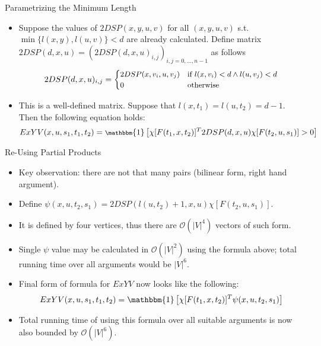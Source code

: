\documentclass{beamer}
\newcommand{\OO}{\mathcal{O}}
\begin{document}
\begin{frame}{Parametrizing the Minimum Length}
    \begin{itemize}
        \item Suppose the values of $2DSP(x, y, u, v)$ for all $(x, y, u, v)$ s.t. $\min\{l(x, y), l(u, v)\} < d$ are already calculated. Define matrix $2DSP(d,x,u) = (2DSP(d,x,u)_{i,j})_{i,j=0,\ldots,n-1}$ as follows
        \begin{equation}
            \small
            2DSP(d,x,u)_{i,j} = \begin{cases}
                2DSP(x,v_i,u,v_j) & \text{if } l(x,v_i) < d \wedge l(u,v_j) < d \\
                0                 & \text{otherwise}
            \end{cases}
        \end{equation}
        \item This is a well-defined matrix. Suppose that $l(x, t_1) = l(u, t_2) = d - 1$. Then the following equation holds:
        \begin{equation}
            \footnotesize
            ExYV(x, u, s_1, t_1, t_2) = \mathbbm{1}\left[ \chi[F(t_1, x, t_2)]^T 2DSP(d, x, u) \chi[F(t_2, u, s_1)]  > 0 \right]
        \end{equation}
    \end{itemize}
\end{frame}

\begin{frame}{Re-Using Partial Products}
    \begin{itemize}
        \item Key observation: there are not that many pairs (bilinear form, right hand argument).
        \item Define $\psi(x, u, t_2, s_1) = 2DSP(l(u, t_2) + 1, x, u) \chi[F(t_2, u, s_1)]$.
        \item It is defined by four vertices, thus there are $\OO(|V|^4)$ vectors of such form.
        \item Single $\psi$ value may be calculated in $\OO(|V|^2)$ using the formula above; total running time over all arguments would be $|V|^6$.
        \item Final form of formula for $ExYV$ now looks like the following:
        \begin{equation}
            ExYV(x, u, s_1, t_1, t_2) = \mathbbm{1}\left[ \chi[F(t_1, x, t_2)]^T \psi(x, u, t_2, s_1) \right]        
        \end{equation}
        \item Total running time of using this formula over all suitable arguments is now also bounded by $\OO(|V|^6)$.
    \end{itemize}
\end{frame}
\end{document}
